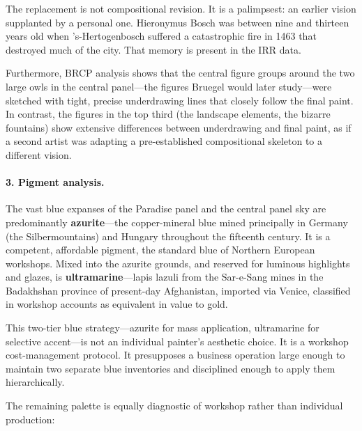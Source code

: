 The replacement is not compositional revision.  It is a palimpsest: an
earlier vision supplanted by a personal one.  Hieronymus Bosch was between
nine and thirteen years old when 's-Hertogenbosch suffered a catastrophic
fire in 1463 that destroyed much of the city.  That memory is present in
the IRR data.

Furthermore, BRCP analysis shows that the central figure groups around
the two large owls in the central panel---the figures Bruegel would later
study---were sketched with tight, precise underdrawing lines that closely
follow the final paint.  In contrast, the figures in the top third (the
landscape elements, the bizarre fountains) show extensive differences
between underdrawing and final paint, as if a second artist was adapting
a pre-established compositional skeleton to a different vision.

\paragraph{3. Pigment analysis.}
The vast blue expanses of the Paradise panel and the central panel sky are
predominantly \textbf{azurite}---the copper-mineral blue mined principally
in Germany (the Silbermountains) and Hungary throughout the fifteenth
century.  It is a competent, affordable pigment, the standard blue of
Northern European workshops.  Mixed into the azurite grounds, and reserved
for luminous highlights and glazes, is \textbf{ultramarine}---lapis lazuli
from the Sar-e-Sang mines in the Badakhshan province of present-day
Afghanistan, imported via Venice, classified in workshop accounts as
equivalent in value to gold.

This two-tier blue strategy---azurite for mass application, ultramarine
for selective accent---is not an individual painter's aesthetic choice.
It is a workshop cost-management protocol.  It presupposes a business
operation large enough to maintain two separate blue inventories and
disciplined enough to apply them hierarchically.

The remaining palette is equally diagnostic of workshop rather than
individual production:

